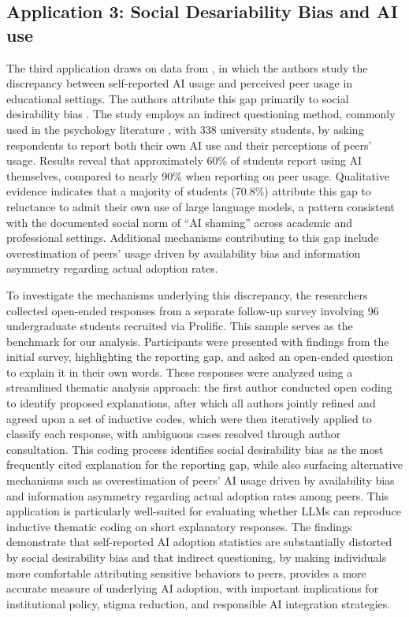 \documentclass[11pt]{article}
\begin{document}
\begin{sloppypar}



\subsection{Application 3: Social Desariability Bias and AI use \citep{ling2025underreporting} }

The third application draws on data from \citet{ling2025underreporting}, in which the authors study the discrepancy between self-reported AI usage and perceived peer usage in educational settings. The authors attribute this gap primarily to social desirability bias \citep{krumpal2013determinants}. The study employs an indirect questioning method, commonly used in the psychology literature \citep{fisher1993social}, with 338 university students, by asking respondents to report both their own AI use and their perceptions of peers’ usage. Results reveal that approximately 60\% of students report using AI themselves, compared to nearly 90\% when reporting on peer usage. Qualitative evidence indicates that a majority of students (70.8\%) attribute this gap to reluctance to admit their own use of large language models, a pattern consistent with the documented social norm of “AI shaming” across academic and professional settings. Additional mechanisms contributing to this gap include overestimation of peers’ usage driven by availability bias and information asymmetry regarding actual adoption rates.

To investigate the mechanisms underlying this discrepancy, the researchers collected open-ended responses from a separate follow-up survey involving 96 undergraduate students recruited via Prolific. This sample serves as the benchmark for our analysis. Participants were presented with findings from the initial survey, highlighting the reporting gap, and asked an open-ended question to explain it in their own words. These responses were analyzed using a streamlined thematic analysis approach: the first author conducted open coding to identify proposed explanations, after which all authors jointly refined and agreed upon a set of inductive codes, which were then iteratively applied to classify each response, with ambiguous cases resolved through author consultation. This coding process identifies social desirability bias as the most frequently cited explanation for the reporting gap, while also surfacing alternative mechanisms such as overestimation of peers' AI usage driven by availability bias and information asymmetry regarding actual adoption rates among peers. This application is particularly well-suited for evaluating whether LLMs can reproduce inductive thematic coding on short explanatory responses. The findings demonstrate that self-reported AI adoption statistics are substantially distorted by social desirability bias and that indirect questioning, by making individuals more comfortable attributing sensitive behaviors to peers, provides a more accurate measure of underlying AI adoption, with important implications for institutional policy, stigma reduction, and responsible AI integration strategies.



\end{sloppypar}
\end{document}
